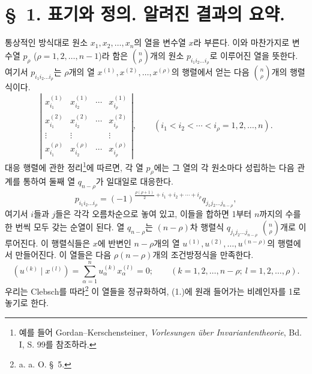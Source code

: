 
\section*{\S\ 1. 표기와 정의. 알려진 결과의 요약.}
통상적인 방식대로 원소 $x_1,x_2,\ldots,x_n$의 열을 변수열 $x$라 부른다. 이와 마찬가지로 변수열 $p_\rho$ ($\rho=1,2,\ldots,n-1$)라 함은 $\binom n\rho$개의 원소 $p_{i_1i_2\ldots i_\rho}$로 이루어진 열을 뜻한다. 여기서 $p_{i_1i_2\ldots i_\rho}$는 $\rho$개의 열 $x^{(1)},x^{(2)},\ldots,x^{(\rho)}$의 행렬에서 얻는 다음 $\binom n\rho$개의 행렬식이다.
\[
\left|\begin{array}{cccc}
 x_{i_1}^{(1)}&x_{i_2}^{(1)}&\cdots&x_{i_\rho}^{(1)}\\
 x_{i_1}^{(2)}&x_{i_2}^{(2)}&\cdots&x_{i_\rho}^{(2)}\\
 \vdots&\vdots&&\vdots\\
 x_{i_1}^{(\rho)}&x_{i_2}^{(\rho)}&\cdots&x_{i_\rho}^{(\rho)}
\end{array}\right|,
\qquad (i_1<i_2<\cdots<i_\rho=1,2,\ldots,n).
\]
대응 행렬에 관한 정리\footnote{예를 들어 Gordan--Kerschensteiner, \emph{Vorlesungen über Invariantentheorie}, Bd. I, S. 99를 참조하라.}에 따르면, 각 열 $p_\rho$에는 그 열의 각 원소마다 성립하는 다음 관계를 통하여 둘째 열 $q_{n-\rho}$가 일대일로 대응한다.
\begin{equation}
 p_{i_1i_2\ldots i_\rho}=(-1)^{\frac{\rho(\rho+1)}{2}+i_1+i_2+\cdots+i_\rho}q_{j_1j_2\ldots j_{n-\rho}},
\tag{1}
\end{equation}
여기서 $i$들과 $j$들은 각각 오름차순으로 놓여 있고, 이들을 합하면 1부터 $n$까지의 수를 한 번씩 모두 갖는 순열이 된다. 열 $q_{n-\rho}$는 $(n-\rho)$차 행렬식 $q_{j_1j_2\ldots j_{n-\rho}}$ $\binom n\rho$개로 이루어진다. 이 행렬식들은 $x$에 반변인 $n-\rho$개의 열 $u^{(1)},u^{(2)},\ldots,u^{(n-\rho)}$의 행렬에서 만들어진다. 이 열들은 다음 $\rho(n-\rho)$개의 조건방정식을 만족한다.
\begin{equation}
 (u^{(k)}\mid x^{(l)})=\sum_{\alpha=1}^{n}u_\alpha^{(k)}x_\alpha^{(l)}=0;
 \qquad (k=1,2,\ldots,n-\rho;\ l=1,2,\ldots,\rho).
\tag{2}
\end{equation}
우리는 Clebsch를 따라\footnote{a. a. O. \S\ 5.} 이 열들을 정규화하여, (1.)에 원래 들어가는 비례인자를 1로 놓기로 한다.
